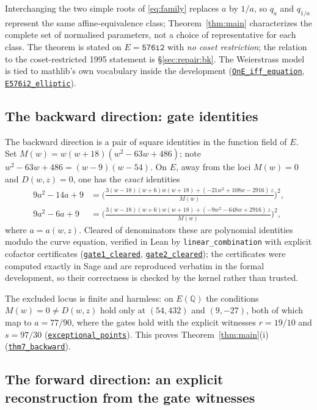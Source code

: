 \documentclass[11pt]{amsart}
\newcommand{\Q}{\mathbb{Q}}
\newcommand{\repourl}{https://github.com/hirokifukui/rd-quartics-classification}
\newcommand{\repotag}{v1.1.0}
\newcommand{\leanline}[3]{\href{\repourl/blob/\repotag/#1\#L#2}{\texttt{#3}}}
\begin{document}
Interchanging the two simple roots of \eqref{eq:family} replaces $a$ by
$1/a$, so $q_a$ and $q_{1/a}$ represent the same affine-equivalence
class; Theorem~\ref{thm:main} characterizes the complete set of
normalised parameters, not a choice of representative for each class.
The theorem is stated on $E = \texttt{576i2}$ with \emph{no coset
restriction}; the relation to the coset-restricted 1995 statement is
\S\ref{sec:repair:bk}.  The Weierstrass model is tied to mathlib's own
vocabulary inside the development
(\leanline{Thm7Prime/Master.lean}{288}{OnE\_iff\_equation},
\leanline{Thm7Prime/Master.lean}{296}{E576i2\_elliptic}).

\subsection{The backward direction: gate identities}
\label{sec:repair:backward}

The backward direction is a pair of square identities in the function
field of $E$.  Set $M(w) = w(w+18)(w^2-63w+486)$; note
$w^2-63w+486 = (w-9)(w-54)$.  On $E$, away from the loci
$M(w) = 0$ and $D(w,z) = 0$, one has the \emph{exact} identities
\begin{align}
9a^2 - 14a + 9 &=
\Big(\tfrac{3(w-18)(w+6)w(w+18) + (-21w^2+108w-2916)\,z}{M(w)}\Big)^{2},
\label{eq:g1sq}\\
9a^2 - 6a + 9 &=
\Big(\tfrac{3(w-18)(w+6)w(w+18) + (-9w^2-648w+2916)\,z}{M(w)}\Big)^{2},
\label{eq:g2sq}
\end{align}
where $a = a(w,z)$.  Cleared of denominators these are polynomial
identities modulo the curve equation, verified in Lean by
\texttt{linear\_combination} with explicit cofactor certificates
(\leanline{Thm7Prime/Master.lean}{99}{gate1\_cleared},
\leanline{Thm7Prime/Master.lean}{108}{gate2\_cleared}); the
certificates were computed exactly in Sage and are reproduced verbatim
in the formal development, so their correctness is checked by the
kernel rather than trusted.

The excluded locus is finite and harmless: on $E(\Q)$ the conditions
$M(w) = 0 \neq D(w,z)$ hold only at $(54,432)$ and $(9,-27)$, both of
which map to $a = 77/90$, where the gates hold with the explicit
witnesses $r = 19/10$ and $s = 97/30$
(\leanline{Thm7Prime/Master.lean}{195}{exceptional\_points}).  This
proves Theorem~\ref{thm:main}(i)
(\leanline{Thm7Prime/Master.lean}{255}{thm7\_backward}).

\subsection{The forward direction: an explicit reconstruction from the
gate witnesses}\label{sec:repair:forward}
\end{document}
